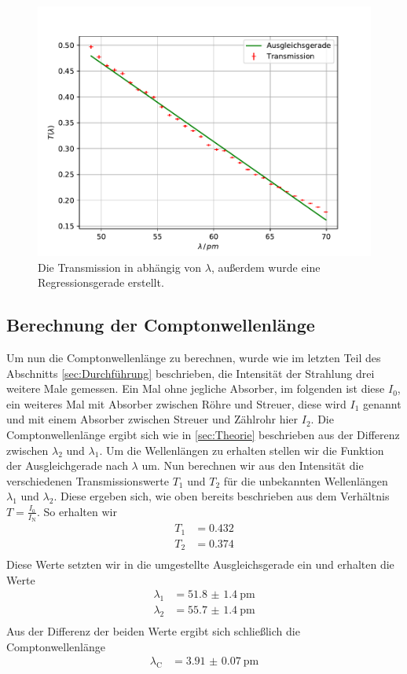 \begin{figure}
  \centering
  \includegraphics[width=\textwidth]{content/data/Transmission.pdf}
  \caption{Die Transmission in abhängig von $\lambda$, außerdem wurde eine Regressionsgerade erstellt.}
  \label{fig:trans}
\end{figure}

\FloatBarrier
\subsection{Berechnung der Comptonwellenlänge}
Um nun die Comptonwellenlänge zu berechnen, wurde wie im letzten Teil des Abschnitts \ref{sec:Durchführung} beschrieben, die Intensität der Strahlung drei weitere Male gemessen.
Ein Mal ohne jegliche Absorber, im folgenden ist diese $I_0$, ein weiteres Mal mit Absorber zwischen Röhre und Streuer, diese wird $I_1$ genannt und mit einem Absorber zwischen Streuer und Zählrohr hier $I_2$.
Die Comptonwellenlänge ergibt sich wie in \ref{sec:Theorie} beschrieben aus der Differenz zwischen $\lambda_2$ und $\lambda_1$.
Um die Wellenlängen zu erhalten stellen wir die Funktion der Ausgleichgerade nach $\lambda$ um.
Nun berechnen wir aus den Intensität die verschiedenen Transmissionswerte $T_1$ und $T_2$ für die unbekannten Wellenlängen $\lambda_1$ und $\lambda_2$.
Diese ergeben sich, wie oben bereits beschrieben aus dem Verhältnis $T = \frac{I_0}{I_\text{N}}$.
So erhalten wir
\begin{align*}
  T_1 & = 0.432 \\
  T_2 & = 0.374 \\
\end{align*}
Diese Werte setzten wir in die umgestellte Ausgleichsgerade ein und erhalten die Werte
\begin{align*}
  \lambda_1 &= \SI{51.8(14)}{\pico\meter}\\
  \lambda_2 &= \SI{55.7(14)}{\pico\meter}\\
\end{align*}
Aus der Differenz der beiden Werte ergibt sich schließlich die Comptonwellenlänge
\begin{align*}
  \lambda_\text{C} &= \SI{3.91(7)}{\pico\meter}
\end{align*}